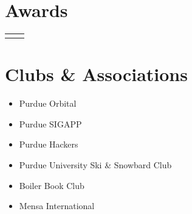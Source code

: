 \documentclass[
	10pt, %
]{FreemanCV}
\begin{document}
\begin{paracol}{2}
\begin{supertabular}{r l}

\end{supertabular}


\section{Awards}




\begin{supertabular}{r l} %






\end{supertabular}


\section{Clubs \& Associations}

\begin{itemize}
	\item Purdue Orbital
	\item Purdue SIGAPP
	\item Purdue Hackers
	\item Purdue University Ski \& Snowbard Club
	\item Boiler Book Club
	\item Mensa International
\end{itemize}


\end{paracol}
\end{document}
